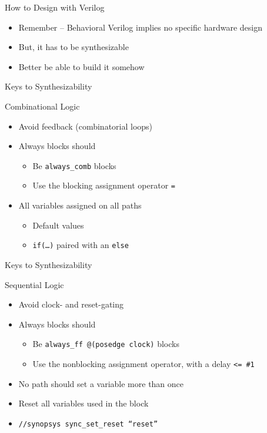 \documentclass[table,dvipsnames,colorlinks=true]{beamer}
\begin{document}
\begin{frame}{How to Design with Verilog}
    \begin{itemize}
        \item Remember -- Behavioral Verilog implies no specific hardware design
        \item But, it has to be synthesizable
        \item Better be able to build it somehow
    \end{itemize}
\end{frame}

\begin{frame}{Keys to Synthesizability}
    \begin{block}{Combinational Logic}
        \begin{itemize}
            \item Avoid feedback (combinatorial loops)
            \item Always blocks should
                \begin{itemize}
                    \item Be \texttt{always\_comb} blocks
                    \item Use the blocking assignment operator \texttt{=}
                \end{itemize}
            \item All variables assigned on all paths
                \begin{itemize}
                    \item Default values
                    \item \texttt{if(\dots)} paired with an \texttt{else}
                \end{itemize}
        \end{itemize}
    \end{block}
\end{frame}

\begin{frame}{Keys to Synthesizability}
    \begin{block}{Sequential Logic}
        \begin{itemize}
            \item Avoid clock- and reset-gating
            \item Always blocks should
                \begin{itemize}
                    \item Be \texttt{always\_ff @(posedge clock)} blocks
                    \item Use the nonblocking assignment operator, with a delay
                        \texttt{<= \#1}
                \end{itemize}
            \item No path should set a variable more than once
            \item Reset all variables used in the block
            \item \texttt{//synopsys sync\_set\_reset ``reset''}
        \end{itemize}
    \end{block}
\end{frame}
\end{document}
